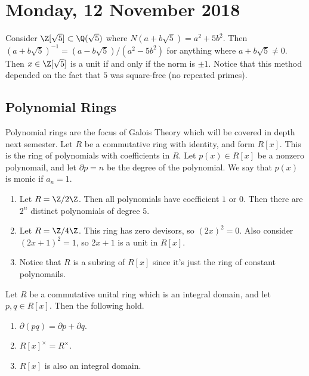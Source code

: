 \section{Monday, 12 November 2018}

\begin{example}
Consider $\Z[\sqrt{5}] \subset \Q(\sqrt{5})$ where $N(a+b\sqrt{5}) = a^2 + 5b^2$. Then $(a+b\sqrt{5})^{-1} = (a-b\sqrt{5})/(a^2-5b^2)$ for anything where $a+b\sqrt{5} \not=0$. Then $x \in \Z[\sqrt{5}]$ is a unit if and only if the norm is $\pm 1$. Notice that this method depended on the fact that $5$ was square-free (no repeated primes).
\end{example}

\subsection{Polynomial Rings}

Polynomial rings are the focus of Galois Theory which will be covered in depth next semester. Let $R$ be a commutative ring with identity, and form $R[x]$. This is the ring of polynomials with coefficients in $R$. Let $p(x) \in R[x]$ be a nonzero polynomail, and let ${\partial p} = n$ be the degree of the polynomial. We say that $p(x)$ is monic if $a_n = 1$.

\begin{example}
\begin{enumerate}
\item Let $R = \Z/2\Z$. Then all polynomials have coefficient $1$ or $0$. Then there are $2^n$ distinct polynomials of degree $5$.

\item Let $R = \Z/4\Z$. This ring has zero devisors, so $(2x)^2 = 0$. Also consider $(2x+1)^2 = 1$, so $2x + 1$ is a unit in $R[x]$.

\item Notice that $R$ is a subring of $R[x]$ since it's just the ring of constant polynomails.
\end{enumerate}
\end{example}

\begin{proposition}
Let $R$ be a commutative unital ring which is an integral domain, and let $p,q \in R[x]$. Then the following hold.
\begin{enumerate}
\item $\partial (pq) = \partial p + \partial q$.
\item $R[x]^\times = R^\times$.
\item $R[x]$ is also an integral domain.
\end{enumerate}
\end{proposition}

